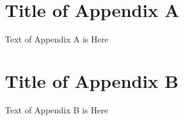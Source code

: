 \section{Title of Appendix A}

Text of Appendix A is Here

\section{Title of Appendix B}

Text of Appendix B is Here